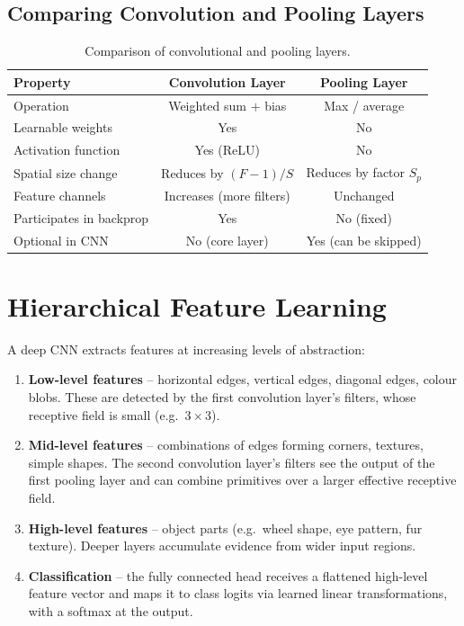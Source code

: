 \documentclass[12pt,a4paper]{article}
\begin{document}
\subsection{Comparing Convolution and Pooling Layers}

\begin{table}[ht]
\centering
\caption{Comparison of convolutional and pooling layers.}
\label{tab:conv_vs_pool}
\begin{tabular}{lcc}
\toprule
\textbf{Property} & \textbf{Convolution Layer} & \textbf{Pooling Layer} \\
\midrule
Operation & Weighted sum $+$ bias & Max / average \\
Learnable weights & Yes & No \\
Activation function & Yes (ReLU) & No \\
Spatial size change & Reduces by $(F-1)/S$ & Reduces by factor $S_p$ \\
Feature channels & Increases (more filters) & Unchanged \\
Participates in backprop & Yes & No (fixed) \\
Optional in CNN & No (core layer) & Yes (can be skipped) \\
\bottomrule
\end{tabular}
\end{table}

\section{Hierarchical Feature Learning}
\label{sec:hierarchical}

A deep CNN extracts features at increasing levels of abstraction:

\begin{enumerate}[label=\textbf{Layer \arabic*:}]
  \item \textbf{Low-level features} -- horizontal edges, vertical edges,
        diagonal edges, colour blobs.  These are detected by the first
        convolution layer's filters, whose receptive field is small (e.g.\
        $3\times3$).
  \item \textbf{Mid-level features} -- combinations of edges forming corners,
        textures, simple shapes.  The second convolution layer's filters see
        the output of the first pooling layer and can combine primitives over
        a larger effective receptive field.
  \item \textbf{High-level features} -- object parts (e.g.\ wheel shape, eye
        pattern, fur texture).  Deeper layers accumulate evidence from wider
        input regions.
  \item \textbf{Classification} -- the fully connected head receives a
        flattened high-level feature vector and maps it to class logits via
        learned linear transformations, with a softmax at the output.
\end{enumerate}
\end{document}

